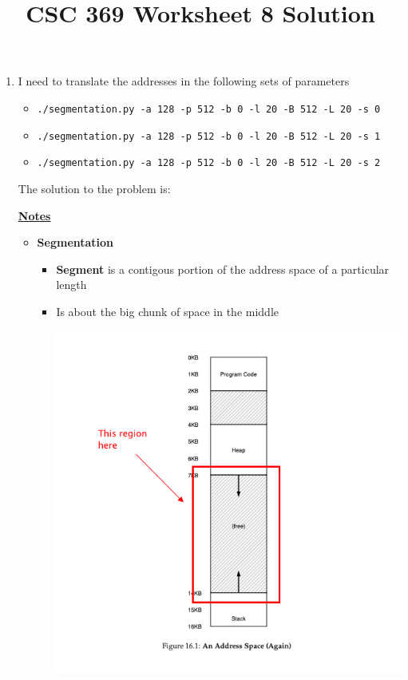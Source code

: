 \documentclass[12pt]{article}
\begin{document}
\title{CSC 369 Worksheet 8 Solution}

\maketitle

\bigskip

\begin{enumerate}[1.]
    \item

    \bigskip

    I need to translate the addresses in the following sets of parameters

    \begin{itemize}
        \item \texttt{./segmentation.py -a 128 -p 512 -b 0 -l 20 -B 512 -L 20 -s 0}
        \item \texttt{./segmentation.py -a 128 -p 512 -b 0 -l 20 -B 512 -L 20 -s 1}
        \item \texttt{./segmentation.py -a 128 -p 512 -b 0 -l 20 -B 512 -L 20 -s 2}
    \end{itemize}

    \bigskip

    The solution to the problem is:


    \bigskip

    \underline{\textbf{Notes}}

    \begin{itemize}
        \item \textbf{Segmentation}

        \begin{itemize}
            \item \textbf{Segment} is a contigous portion of the address space of a particular length
            \item Is about the big chunk of space in the middle

            \begin{center}
            \includegraphics[width=0.8\linewidth]{images/worksheet_8_solution_1.png}
            \end{center}


\end{itemize}
\end{itemize}
\end{enumerate}
\end{document}
